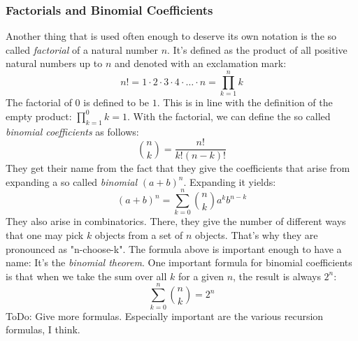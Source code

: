 \subsubsection{Factorials and Binomial Coefficients}
\label{Sec:FactorialsAndBinomCoeffs}
Another thing that is used often enough to deserve its own notation is the so called \emph{factorial} of a natural number $n$. It's defined as the product of all positive natural numbers up to $n$ and denoted with an exclamation mark:
\begin{equation}
 n! = 1 \cdot 2 \cdot 3 \cdot 4 \cdot \ldots \cdot n = \prod_{k=1}^{n} k
\end{equation}
The factorial of $0$ is defined to be $1$. This is in line with the definition of the empty product: $\prod_{k=1}^{0} k = 1$. With the factorial, we can define the so called \emph{binomial coefficients} as follows:
\begin{equation}
\label{Eq:BinomialCoeffs}
 \binom{n}{k} = \frac{n!}{k! (n-k)!}
\end{equation}
They get their name from the fact that they give the coefficients that arise from expanding a so called \emph{binomial} $(a+b)^n$. Expanding it yields:
\begin{equation}
\label{Eq:BinomialTheorem}
(a+b)^n = \sum_{k=0}^{n} \binom{n}{k} a^k b^{n-k}
\end{equation}
They also arise in combinatorics. There, they give the number of different ways that one may pick $k$ objects from a set of $n$ objects. That's why they are pronounced as "n-choose-k". The formula above is important enough to have a name: It's the \emph{binomial theorem}. One important formula for binomial coefficients is that when we take the sum over all $k$ for a given $n$, the result is always $2^n$:
\begin{equation}
\label{Eq:BinomialCoeffsSum}
\sum_{k=0}^n \binom{n}{k} = 2^n
\end{equation}
ToDo: Give more formulas. Especially important are the various recursion formulas, I think.


